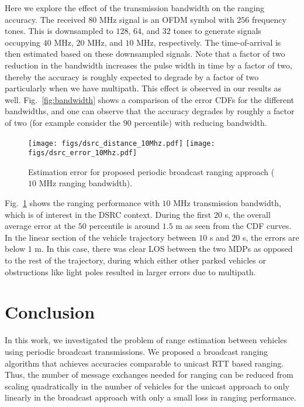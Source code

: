 \documentclass[12pt,journal,final,onecolumn]{IEEEtran}
\theoremstyle{definition}
\theoremstyle{myremark}
\begin{document}
Here we explore the effect of the transmission bandwidth on the ranging
accuracy.  The received $80$ MHz signal is an OFDM symbol with $256$ frequency
tones. This is downsampled to $128$, $64$, and $32$ tones to generate signals
occupying $40$ MHz, $20$ MHz, and $10$ MHz, respectively. The time-of-arrival is
then estimated based on these downsampled signals. Note that a factor of two
reduction in the bandwidth increases the pulse width in time by a factor of two,
thereby the accuracy is roughly expected to degrade by a factor of two
particularly when we have multipath. This effect is observed in our results as
well.  Fig.~\ref{fig:bandwidth} shows a comparison of the error CDFs for the
different bandwidths, and one can observe that the accuracy degrades by roughly
a factor of two (for example consider the $90$ percentile) with reducing
bandwidth.

\begin{figure}[htbp]
    \centering 
    \texttt{[image: figs/dsrc\_distance\_10Mhz.pdf]} 
    \texttt{[image: figs/dsrc\_error\_10Mhz.pdf]} 

    \caption{Estimation error for proposed periodic broadcast ranging approach ($10$ MHz ranging
    bandwidth).}
    \label{fig:broadcast10}
\end{figure}

Fig.~\ref{fig:broadcast10} shows the ranging performance with $10$ MHz
transmission bandwidth, which is of interest in the DSRC context. During the
first $20$ s, the overall average error at the $50$ percentile is around $1.5$ m
as seen from the CDF curves.  In the linear section of the vehicle trajectory
between $10$ s and $20$ s, the errors are below $1$ m. In this case, there was
clear LOS between the two MDPs as opposed to the rest of the trajectory, during
which either other parked vehicles or obstructions like light poles resulted in
larger errors due to multipath.  


\section{Conclusion}
\label{sec:conclusion}

In this work, we investigated the problem of range estimation between vehicles
using periodic broadcast transmissions. We proposed a broadcast ranging
algorithm that achieves accuracies comparable to unicast RTT based ranging.
Thus, the number of message exchanges needed for ranging can be reduced from
scaling quadratically in the number of vehicles for the unicast approach to only
linearly in the broadcast approach with only a small loss in ranging
performance.
\end{document}
